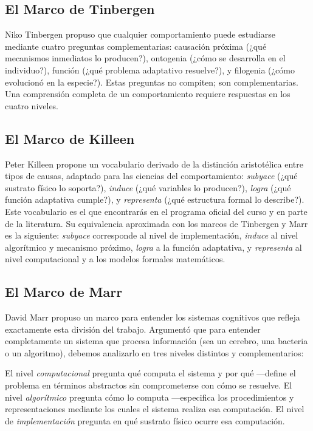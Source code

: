 \documentclass[
  letterpaper,
  DIV=11,
  numbers=noendperiod]{scrreprt}
\begin{document}
\subsection{El Marco de Tinbergen}\label{el-marco-de-tinbergen}

Niko Tinbergen propuso que cualquier comportamiento puede estudiarse
mediante cuatro preguntas complementarias: causación próxima (¿qué
mecanismos inmediatos lo producen?), ontogenia (¿cómo se desarrolla en
el individuo?), función (¿qué problema adaptativo resuelve?), y
filogenia (¿cómo evolucionó en la especie?). Estas preguntas no
compiten; son complementarias. Una comprensión completa de un
comportamiento requiere respuestas en los cuatro niveles.

\subsection{El Marco de Killeen}\label{el-marco-de-killeen}

Peter Killeen propone un vocabulario derivado de la distinción
aristotélica entre tipos de causas, adaptado para las ciencias del
comportamiento: \emph{subyace} (¿qué sustrato físico lo soporta?),
\emph{induce} (¿qué variables lo producen?), \emph{logra} (¿qué función
adaptativa cumple?), y \emph{representa} (¿qué estructura formal lo
describe?). Este vocabulario es el que encontrarás en el programa
oficial del curso y en parte de la literatura. Su equivalencia
aproximada con los marcos de Tinbergen y Marr es la siguiente:
\emph{subyace} corresponde al nivel de implementación, \emph{induce} al
nivel algorítmico y mecanismo próximo, \emph{logra} a la función
adaptativa, y \emph{representa} al nivel computacional y a los modelos
formales matemáticos.

\subsection{El Marco de Marr}\label{el-marco-de-marr}

David Marr propuso un marco para entender los sistemas cognitivos que
refleja exactamente esta división del trabajo. Argumentó que para
entender completamente un sistema que procesa información (sea un
cerebro, una bacteria o un algoritmo), debemos analizarlo en tres
niveles distintos y complementarios:

El nivel \emph{computacional} pregunta qué computa el sistema y por qué
---define el problema en términos abstractos sin comprometerse con cómo
se resuelve. El nivel \emph{algorítmico} pregunta cómo lo computa
---especifica los procedimientos y representaciones mediante los cuales
el sistema realiza esa computación. El nivel de \emph{implementación}
pregunta en qué sustrato físico ocurre esa computación.
\end{document}
